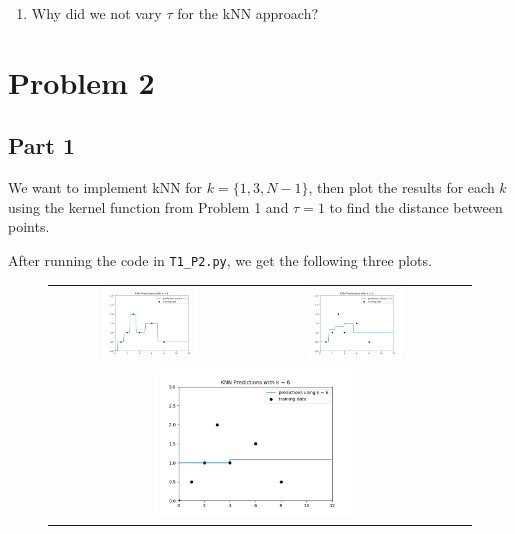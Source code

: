 \documentclass[submit]{harvardml}
\begin{document}
\begin{problem}
\begin{enumerate}
\item Why did we not vary $\tau$ for the kNN approach?

\end{enumerate}

\end{problem}

\newpage

\section{Problem 2}

\subsection{Part 1}
We want to implement kNN for $k = \{1, 3, N-1\}$, then plot the results for each $k$ using the kernel function from Problem 1 and $\tau = 1$ to find the distance between points.

After running the code in \verb+T1_P2.py+, we get the following three plots.

\begin{figure}[h]
\begin{tabular}{ccc}
    \includegraphics[width=0.5\textwidth]{k1.png} & \includegraphics[width=0.5\textwidth]{k3.png} \\ \multicolumn{2}{c}{\includegraphics[width=0.5\textwidth]{k6.png}}
\end{tabular}
\end{figure}
\end{document}
